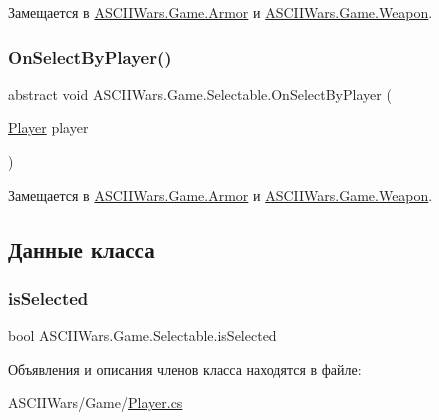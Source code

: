 Замещается в \hyperlink{class_a_s_c_i_i_wars_1_1_game_1_1_armor_af502379d334f2fc7901638f8a8eba130}{A\+S\+C\+I\+I\+Wars.\+Game.\+Armor} и \hyperlink{class_a_s_c_i_i_wars_1_1_game_1_1_weapon_aa03a588bfb93fbf63d4d7bf63ce62ae1}{A\+S\+C\+I\+I\+Wars.\+Game.\+Weapon}.

\hypertarget{class_a_s_c_i_i_wars_1_1_game_1_1_selectable_a95bdcf05ef9ea5f39c81ddd96294968a}{}\label{class_a_s_c_i_i_wars_1_1_game_1_1_selectable_a95bdcf05ef9ea5f39c81ddd96294968a} 
\subsubsection{\texorpdfstring{On\+Select\+By\+Player()}{OnSelectByPlayer()}}
{\footnotesize\ttfamily abstract void A\+S\+C\+I\+I\+Wars.\+Game.\+Selectable.\+On\+Select\+By\+Player (\begin{DoxyParamCaption}\item[{\hyperlink{class_a_s_c_i_i_wars_1_1_game_1_1_player}{Player}}]{player }\end{DoxyParamCaption})\hspace{0.3cm}{\ttfamily [pure virtual]}}



Замещается в \hyperlink{class_a_s_c_i_i_wars_1_1_game_1_1_armor_ab4f8a39af009eef4bbdeb6db67fb9cd5}{A\+S\+C\+I\+I\+Wars.\+Game.\+Armor} и \hyperlink{class_a_s_c_i_i_wars_1_1_game_1_1_weapon_a6cd549ad51fa64884a66b1083098465f}{A\+S\+C\+I\+I\+Wars.\+Game.\+Weapon}.



\subsection{Данные класса}
\hypertarget{class_a_s_c_i_i_wars_1_1_game_1_1_selectable_ad864445e5408f11f74f2e5c843677fb2}{}\label{class_a_s_c_i_i_wars_1_1_game_1_1_selectable_ad864445e5408f11f74f2e5c843677fb2} 
\subsubsection{\texorpdfstring{is\+Selected}{isSelected}}
{\footnotesize\ttfamily bool A\+S\+C\+I\+I\+Wars.\+Game.\+Selectable.\+is\+Selected}



Объявления и описания членов класса находятся в файле\+:\begin{DoxyCompactItemize}
\item 
A\+S\+C\+I\+I\+Wars/\+Game/\hyperlink{_player_8cs}{Player.\+cs}\end{DoxyCompactItemize}
